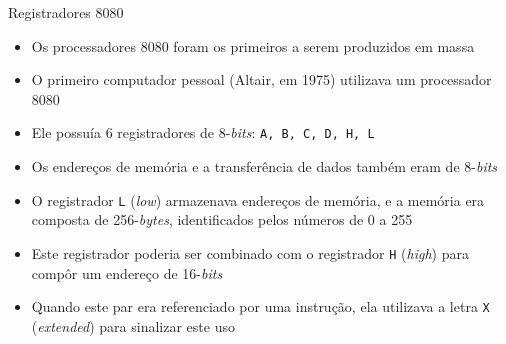\begin{frame}[fragile]{Registradores 8080}

    \begin{itemize}
        \item Os processadores 8080 foram os primeiros a serem produzidos em massa

        \item O primeiro computador pessoal (Altair, em 1975) utilizava um processador 8080

        \item Ele possuía 6 registradores de 8-\textit{bits}: \texttt{A, B, C, D, H, L} 

        \item Os endereços de memória e a transferência de dados também eram de 8-\textit{bits}

        \item O registrador \texttt{L} (\textit{low}) armazenava endereços de memória, e a 
            memória era composta de 256-\textit{bytes}, identificados pelos números de 0 a 255

        \item Este registrador poderia ser combinado com o registrador \texttt{H} 
            (\textit{high}) para compôr um endereço de 16-\textit{bits}

        \item Quando este par era referenciado por uma instrução, ela utilizava a letra \texttt{X} 
            (\textit{extended}) para sinalizar este uso
    \end{itemize}

\end{frame}

